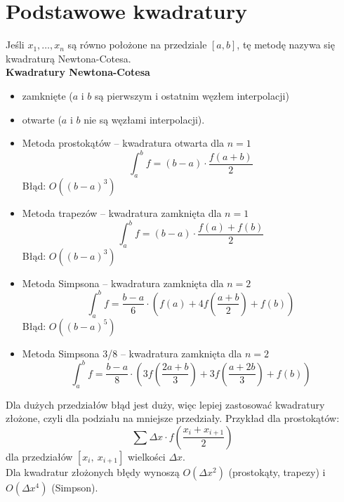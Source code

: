 \section{Podstawowe kwadratury}
Jeśli \( x_1, \dots, x_n \) są równo położone na przedziale \( [a, b] \), tę metodę nazywa się kwadraturą Newtona-Cotesa. \\
\textbf{Kwadratury Newtona-Cotesa}
\begin{itemize}
	\onehalfspacing
	\item zamknięte (\( a \) i \( b \) są pierwszym i ostatnim węzłem interpolacji)
	\item otwarte (\( a \) i \( b \) nie są węzłami interpolacji).
\end{itemize}
\vspace{1.2em}

\begin{itemize}
	\onehalfspacing
	\item Metoda prostokątów – kwadratura otwarta dla \( n = 1 \)
	      \[
		      \int_{a}^{b} f = (b-a) \cdot \frac{f(a+b)}{2}
	      \]
	      Błąd: \( O((b - a)^3) \)
	\item Metoda trapezów – kwadratura zamknięta dla \( n = 1 \)
	      \[
		      \int_{a}^{b} f = (b-a) \cdot \frac{f(a)+f(b)}{2}
	      \]
	      Błąd: \( O((b - a)^3) \)
	\item Metoda Simpsona – kwadratura zamknięta dla \( n = 2 \)
	      \[
		      \int_{a}^{b} f = \frac{b-a}{6} \cdot \left(f(a) + 4f\left(\frac{a+b}{2}\right) + f(b)\right)
	      \]
	      Błąd: \( O((b - a)^5) \)
	\item Metoda Simpsona 3/8 – kwadratura zamknięta dla \( n = 2 \)
	      \[
		      \int_{a}^{b} f = \frac{b-a}{8} \cdot \left(3f\left(\frac{2a+b}{3}\right) + 3f \left(\frac{a+2b}{3}\right) + f(b)\right)
	      \]
\end{itemize}
Dla dużych przedziałów błąd jest duży, więc lepiej zastosować kwadratury złożone, czyli dla podziału na mniejsze przedziały. Przykład dla prostokątów:
\[
	\sum \Delta x \cdot f\left(\frac{x_i + x_{i+1}}{2}\right)
\]
dla przedziałów \( [x_i,\:x_{i+1}] \) wielkości \( \Delta x \). \\
Dla kwadratur złożonych błędy wynoszą \( O(\Delta x^2) \) (prostokąty, trapezy) i \( O(\Delta x^4) \) (Simpson).